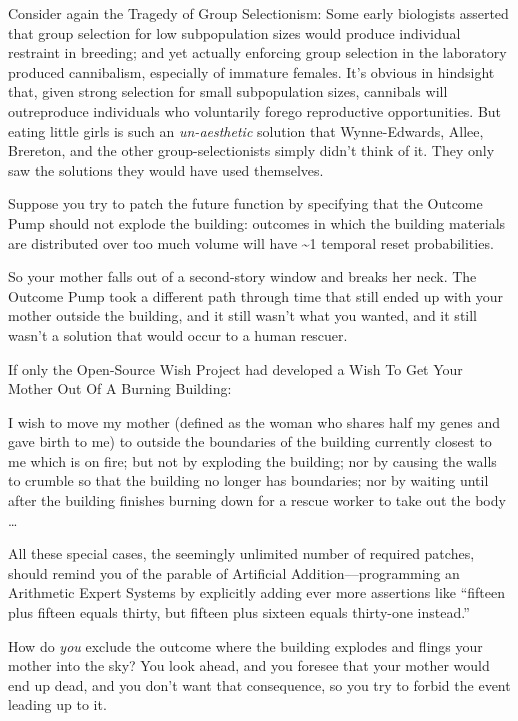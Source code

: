 {
 Consider again the Tragedy of Group Selectionism: Some early
biologists asserted that group selection for low subpopulation sizes
would produce individual restraint in breeding; and yet actually
enforcing group selection in the laboratory produced cannibalism,
especially of immature females. It's obvious in
hindsight that, given strong selection for small subpopulation sizes,
cannibals will outreproduce individuals who voluntarily forego
reproductive opportunities. But eating little girls is such an
\textit{un-aesthetic} solution that Wynne-Edwards, Allee, Brereton, and
the other group-selectionists simply didn't think of
it. They only saw the solutions they would have used themselves.}

{
 Suppose you try to patch the future function by specifying that
the Outcome Pump should not explode the building: outcomes in which the
building materials are distributed over too much volume will have \~{}1
temporal reset probabilities.}

{
 So your mother falls out of a second-story window and breaks her
neck. The Outcome Pump took a different path through time that still
ended up with your mother outside the building, and it still
wasn't what you wanted, and it still
wasn't a solution that would occur to a human rescuer.}

{
 If only the Open-Source Wish Project had developed a Wish To Get
Your Mother Out Of A Burning Building:}

{
 I wish to move my mother (defined as the woman who shares half my
genes and gave birth to me) to outside the boundaries of the building
currently closest to me which is on fire; but not by exploding the
building; nor by causing the walls to crumble so that the building no
longer has boundaries; nor by waiting until after the building finishes
burning down for a rescue worker to take out the body \ldots}

{
 All these special cases, the seemingly unlimited number of
required patches, should remind you of the parable of Artificial
Addition---programming an Arithmetic Expert Systems by explicitly
adding ever more assertions like ``fifteen plus
fifteen equals thirty, but fifteen plus sixteen equals thirty-one
instead.''}

{
 How do \textit{you} exclude the outcome where the building
explodes and flings your mother into the sky? You look ahead, and you
foresee that your mother would end up dead, and you
don't want that consequence, so you try to forbid the
event leading up to it.}

